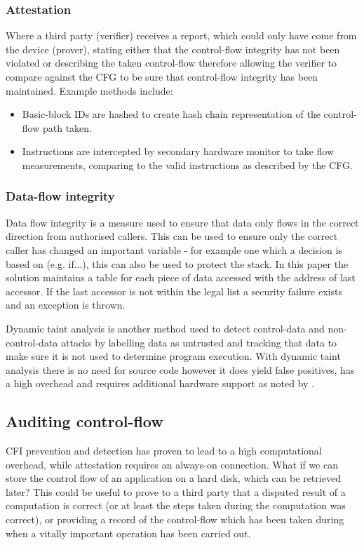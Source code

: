 \subsubsection{Attestation}
Where a third party (verifier) receives a report, which could only have come from the device (prover), stating either that the control-flow integrity has not been violated or describing the taken control-flow therefore allowing the verifier to compare against the CFG to be sure that control-flow integrity has been maintained. Example methods include:
\begin{itemize}
	\item Basic-block IDs are hashed to create hash chain representation of the control-flow path taken.
	\item Instructions are intercepted by secondary hardware monitor to take flow measurements, comparing to the valid instructions as described by the CFG.
\end{itemize}

\subsubsection{Data-flow integrity}

Data flow integrity \cite{Castro2006} is a measure used to ensure that data only flows in the correct direction from authorised callers. This can be used to ensure only the correct caller has changed an important variable - for example one which a decision is based on (e.g. if...), this can also be used to protect the stack.
In this paper the solution maintains a table for each piece of data accessed with the address of last accessor. If the last accessor is not within the legal list a security failure exists and an exception is thrown.

Dynamic taint analysis is another method \cite{Davi2009} used to detect control-data and non-control-data attacks by labelling data as untrusted and tracking that data to make sure it is not used to determine program execution. With dynamic taint analysis there is no need for source code however it does yield false positives, has a high overhead and requires additional hardware support as noted by \cite{Castro2006}.

\subsection{Auditing control-flow}
CFI prevention and detection has proven to lead to a high computational overhead, while attestation requires an always-on connection. What if we can store the control flow of an application on a hard disk, which can be retrieved later? This could be useful to prove to a third party that a disputed result of a computation is correct (or at least the steps taken during the computation was correct), or providing a record of the control-flow which has been taken during when a vitally important operation has been carried out.

